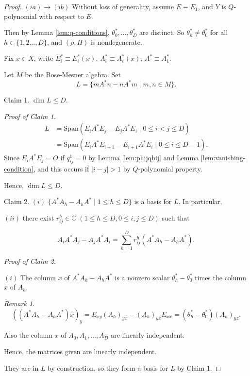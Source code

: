 \documentclass[
]{book}
\theoremstyle{definition}
\theoremstyle{definition}
\theoremstyle{definition}
\theoremstyle{definition}
\theoremstyle{remark}
\newtheorem*{remark}{Remark}
\begin{document}
\begin{proof}
\leavevmode

\((ia)\to(ib)\) Without loss of generality, assume \(E \equiv E_1\), and \(Y\) is \(Q\)-polynomial with respect to \(E\).

Then by Lemma \ref{lem:q-conditions},
\(\theta_0^*, \ldots, \theta^*_D\) are distinct. So \(\theta^*_h\neq \theta^*_0\) for all \(h\in \{1,2\ldots, D\}\), and \((\rho, H)\) is nondegenerate.

Fix \(x\in X\), write \(E^*_i\equiv E^*_i(x)\), \(A^*_i \equiv A^*_i(x)\), \(A^* \equiv A_1^*\).

Let \(M\) be the Bose-Mesner algebra. Set
\[L = \{mA^*n - nA^*m\mid m, n\in M\}.\]

Claim 1. \(\dim L \leq D\).

\emph{Proof of Claim 1.}
\begin{align}
L & = \mathrm{Span}(E_iA^*E_j - E_jA^*E_i \mid 0\leq i<j\leq D)\\
& = \mathrm{Span}(E_iA^*E_{i+1} - E_{i+1}A^*E_i \mid 0\leq i\leq D-1).
\end{align}
Since \(E_iA^*E_j = O\) if \(q^1_{ij} = 0\) by Lemma \ref{lem:phijqhij} and Lemma \ref{lem:vanishing-condition},
and this occurs if \(|i-j|>1\) by \(Q\)-polynomial property.

Hence, \(\dim L \leq D\).

Claim 2. \((i)\) \(\{A^*A_h - A_hA^*\mid 1\leq h\leq D\}\) is a basis for \(L\). In particular,

\((ii)\) there exist \(r^h_{ij}\in \mathbb{C}\) \((1\leq h\leq D, 0\leq i,j\leq D)\) such that

\[A_iA^*A_j - A_jA^*A_i = \sum_{h=1}^D r^h_{ij}(A^*A_h - A_hA^*).\]

\emph{Proof of Claim 2.}

\((i)\) The column \(x\) of \(A^*A_h - A_hA^*\) is a nonzero scalar \(\theta^*_h - \theta^*_0\) times the column \(x\) of \(A_h\).

\begin{remark}
\[ ((A^*A_h - A_hA^*)\hat{x})_y = E_{xy}(A_h)_{yx}- (A_h)_{yx}E_{xx} = (\theta^*_h-\theta^*_0)(A_h)_{yz}.\]
\end{remark}

Also the column \(x\) of \(A_0, A_1, \ldots, A_D\) are linearly independent.

Hence, the matrices given are linearly independent.

They are in \(L\) by construction, so they form a basis for \(L\) by Claim 1.


\end{proof}
\end{document}
